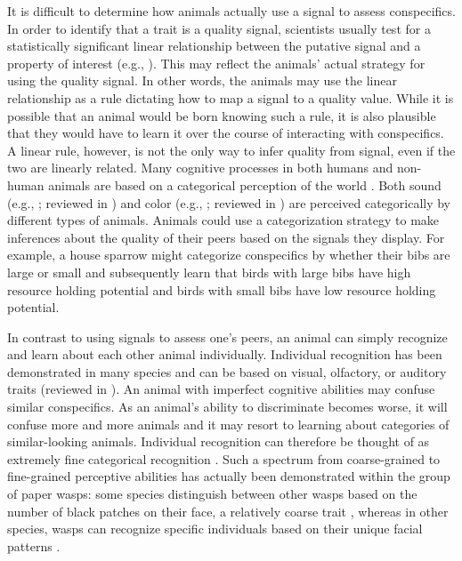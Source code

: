 It is difficult to determine how animals actually use a signal to assess conspecifics. In order to identify that a trait is a quality signal, scientists usually test for a statistically significant linear relationship between the putative signal and a property of interest (e.g., \citep{Rohwer:1981vn,Rohwer:1982fk,Ripoll:2004vn,Tibbetts:2004kx}). This may reflect the animals' actual strategy for using the quality signal. In other words, the animals may use the linear relationship as a rule dictating how to map a signal to a quality value. While it is possible that an animal would be born knowing such a rule, it is also plausible that they would have to learn it over the course of interacting with conspecifics. A linear rule, however, is not the only way to infer quality from signal, even if the two are linearly related. Many cognitive processes in both humans and non-human animals are based on a categorical perception of the world \citep{Harnad:1990ux}. Both sound (e.g., \citep{Wyttenbach:1996wj,Nelson:1989rt}; reviewed in \citep{Bornstein:1987ec,Ehret:1987jh}) and color (e.g., \citep{Lim:2016ye}; reviewed in \citep{Bornstein:1987ec}) are perceived categorically by different types of animals. Animals could use a categorization strategy to make inferences about the quality of their peers based on the signals they display. For example, a house sparrow might categorize conspecifics by whether their bibs are large or small and subsequently learn that birds with large bibs have high resource holding potential and birds with small bibs have low resource holding potential.
 
In contrast to using signals to assess one's peers, an animal can simply recognize and learn about each other animal individually. Individual recognition has been demonstrated in many species and can be based on visual, olfactory, or auditory traits (reviewed in \citep{Tibbetts2007IndividualDifferent}). An animal with imperfect cognitive abilities may confuse similar conspecifics. As an animal's ability to discriminate becomes worse, it will confuse more and more animals and it may resort to learning about categories of similar-looking animals. Individual recognition can therefore be thought of as extremely fine categorical recognition \citep{Barnard:1979fk}. Such a spectrum from coarse-grained to fine-grained perceptive abilities has actually been demonstrated within the group of paper wasps: some species distinguish between other wasps based on the number of black patches on their face, a relatively coarse trait \citep{Tibbetts:2004kx}, whereas in other species, wasps can recognize specific individuals based on their unique facial patterns \citep{Tibbetts:2002ys}. 

